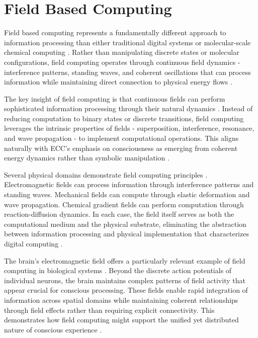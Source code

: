 \section{Field Based Computing}

Field based computing represents a fundamentally different approach to information processing than either traditional digital systems or molecular-scale chemical computing \cite{Bandyopadhyay2020}. Rather than manipulating discrete states or molecular configurations, field computing operates through continuous field dynamics - interference patterns, standing waves, and coherent oscillations that can process information while maintaining direct connection to physical energy flows \cite{Calude2018b}.

The key insight of field computing is that continuous fields can perform sophisticated information processing through their natural dynamics \cite{Chua2017}. Instead of reducing computation to binary states or discrete transitions, field computing leverages the intrinsic properties of fields - superposition, interference, resonance, and wave propagation - to implement computational operations. This aligns naturally with ECC's emphasis on consciousness as emerging from coherent energy dynamics rather than symbolic manipulation \cite{Fromherz2019}.

Several physical domains demonstrate field computing principles \cite{Haken2020}. Electromagnetic fields can process information through interference patterns and standing waves. Mechanical fields can compute through elastic deformation and wave propagation. Chemical gradient fields can perform computation through reaction-diffusion dynamics. In each case, the field itself serves as both the computational medium and the physical substrate, eliminating the abstraction between information processing and physical implementation that characterizes digital computing \cite{McFadden2018}.

The brain's electromagnetic field offers a particularly relevant example of field computing in biological systems \cite{Nikolic2019}. Beyond the discrete action potentials of individual neurons, the brain maintains complex patterns of field activity that appear crucial for conscious processing. These fields enable rapid integration of information across spatial domains while maintaining coherent relationships through field effects rather than requiring explicit connectivity. This demonstrates how field computing might support the unified yet distributed nature of conscious experience \cite{Pockett2021}.

